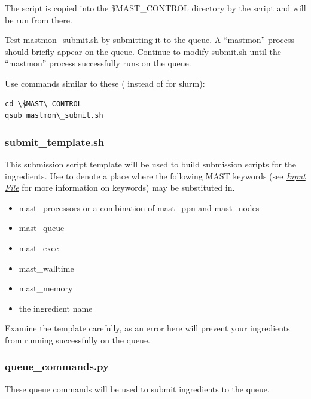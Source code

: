 \documentclass[letterpaper,10pt,english]{sphinxmanual}
\begin{document}
The script is copied into the \$MAST\_CONTROL directory by the  script and will be run from there.

Test mastmon\_submit.sh by submitting it to the queue. A ``mastmon'' process should briefly appear on the queue. Continue to modify submit.sh until the ``mastmon'' process successfully runs on the queue.

Use commands similar to these ( instead of  for slurm):

\begin{Verbatim}[commandchars=\\\{\}]
cd \$MAST\_CONTROL
qsub mastmon\_submit.sh
\end{Verbatim}


\subsubsection{submit\_template.sh}
\label{1_0_installation:submit-template-sh}
This submission script template will be used to build submission scripts for the ingredients. Use  to denote a place where the following MAST keywords (see {\hyperref[3_0_inputfile::doc]{\emph{Input File}}} for more information on keywords) may be substituted in.
\begin{itemize}
\item {} 
mast\_processors or a combination of mast\_ppn and mast\_nodes

\item {} 
mast\_queue

\item {} 
mast\_exec

\item {} 
mast\_walltime

\item {} 
mast\_memory

\item {} 
the ingredient name

\end{itemize}

Examine the template carefully, as an error here will prevent your ingredients from running successfully on the queue.


\subsubsection{queue\_commands.py}
\label{1_0_installation:queue-commands-py}
These queue commands will be used to submit ingredients to the queue.
\end{document}
